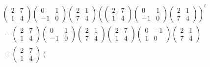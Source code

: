 \documentclass[aps,preprint]{revtex4}
\begin{document}
\begin{align}
& \left( 
\begin{array}{cc}
2 & 7 \\ 
1 & 4%
\end{array}
\right) \left( 
\begin{array}{cc}
0 & 1 \\ 
-1 & 0%
\end{array}
\right) \left( 
\begin{array}{cc}
2 & 1 \\ 
7 & 4%
\end{array}
\right) \left( \left( 
\begin{array}{cc}
2 & 7 \\ 
1 & 4%
\end{array}
\right) \left( 
\begin{array}{cc}
0 & 1 \\ 
-1 & 0%
\end{array}
\right) \left( 
\begin{array}{cc}
2 & 1 \\ 
7 & 4%
\end{array}
\right) \right) ^{t} \\
& =\left( 
\begin{array}{cc}
2 & 7 \\ 
1 & 4%
\end{array}
\right) \left( 
\begin{array}{cc}
0 & 1 \\ 
-1 & 0%
\end{array}
\right) \left( 
\begin{array}{cc}
2 & 1 \\ 
7 & 4%
\end{array}
\right) \left( 
\begin{array}{cc}
2 & 7 \\ 
1 & 4%
\end{array}
\right) \left( 
\begin{array}{cc}
0 & -1 \\ 
1 & 0%
\end{array}
\right) \left( 
\begin{array}{cc}
2 & 1 \\ 
7 & 4%
\end{array}
\right) \\
& =\left( 
\begin{array}{cc}
2 & 7 \\ 
1 & 4%
\end{array}
\right) \left( 
\begin{array}{cc}

\end{array}
\end{align}
\end{document}
